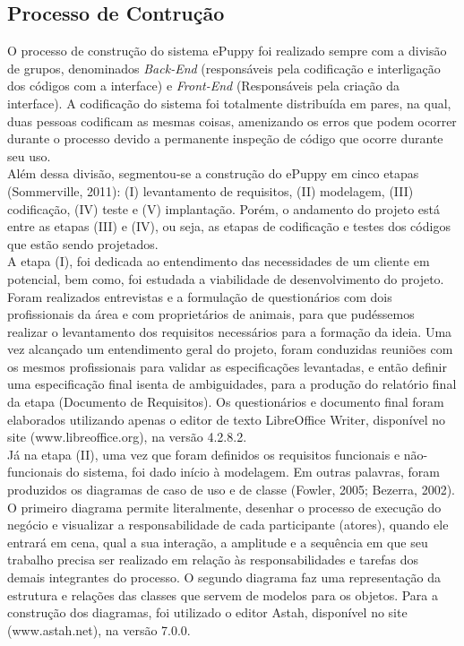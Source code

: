 \subsection{Processo de Contrução}
O processo de construção do sistema ePuppy foi realizado sempre com a divisão de grupos, denominados {\it Back-End} (responsáveis pela codificação e interligação dos códigos com a interface) e {\it Front-End} (Responsáveis pela criação da interface). A codificação do sistema foi totalmente distribuída em pares, na qual, duas pessoas codificam as mesmas coisas, amenizando os erros que podem ocorrer durante o processo devido a permanente inspeção de código que ocorre durante seu uso.
\\
\indent
Além dessa divisão, segmentou-se a construção do ePuppy em cinco etapas (Sommerville, 2011): (I) levantamento de requisitos, (II) modelagem, (III) codificação, (IV) teste e (V) implantação. Porém, o andamento do projeto está entre as etapas (III) e (IV), ou seja, as etapas de codificação e testes dos códigos que estão sendo projetados.
\\
\indent
	A etapa (I), foi dedicada ao entendimento das necessidades de um cliente em potencial, bem como, foi estudada a viabilidade de desenvolvimento do projeto. Foram realizados entrevistas e a formulação de questionários com dois profissionais da área e com proprietários de animais, para que pudéssemos realizar o levantamento dos requisitos necessários para a formação da ideia. Uma vez alcançado um entendimento geral do projeto, foram conduzidas reuniões com os mesmos profissionais para validar as especificações levantadas, e então definir uma especificação final isenta de ambiguidades, para a produção do relatório final da etapa (Documento de Requisitos). Os questionários e documento final foram elaborados utilizando apenas o editor de texto LibreOffice Writer, disponível no site (www.libreoffice.org), na versão 4.2.8.2.
\\
\indent
Já na etapa (II), uma vez que foram definidos os requisitos funcionais e não-funcionais do sistema, foi dado início à modelagem. Em outras palavras, foram produzidos os diagramas de caso de uso e de classe (Fowler, 2005; Bezerra, 2002). O primeiro diagrama permite literalmente, desenhar o processo de execução do negócio e visualizar a responsabilidade de cada participante (atores), quando ele entrará em cena, qual a sua interação, a amplitude e a sequência em que seu trabalho precisa ser realizado em relação às responsabilidades e tarefas dos demais integrantes do processo. O segundo diagrama faz uma representação da estrutura e relações das classes que servem de modelos para os objetos. Para a construção dos diagramas, foi utilizado o editor Astah, disponível no site (www.astah.net), na versão 7.0.0.
